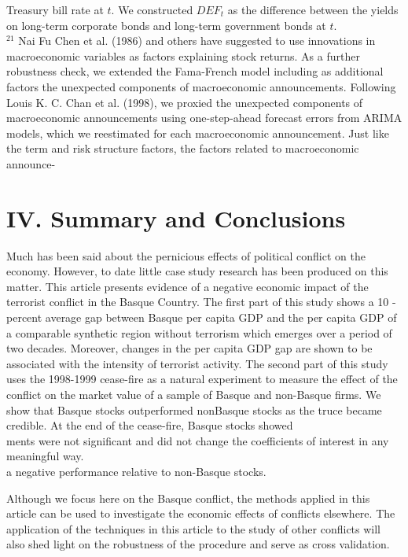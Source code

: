 \documentclass[10pt]{article}
\begin{document}
Treasury bill rate at $t$. We constructed $D E F_{t}$ as the difference between the yields on long-term corporate bonds and long-term government bonds at $t$.\\
${ }^{21}$ Nai Fu Chen et al. (1986) and others have suggested to use innovations in macroeconomic variables as factors explaining stock returns. As a further robustness check, we extended the Fama-French model including as additional factors the unexpected components of macroeconomic announcements. Following Louis K. C. Chan et al. (1998), we proxied the unexpected components of macroeconomic announcements using one-step-ahead forecast errors from ARIMA models, which we reestimated for each macroeconomic announcement. Just like the term and risk structure factors, the factors related to macroeconomic announce-

\section*{IV. Summary and Conclusions}
Much has been said about the pernicious effects of political conflict on the economy. However, to date little case study research has been produced on this matter. This article presents evidence of a negative economic impact of the terrorist conflict in the Basque Country. The first part of this study shows a 10 -percent average gap between Basque per capita GDP and the per capita GDP of a comparable synthetic region without terrorism which emerges over a period of two decades. Moreover, changes in the per capita GDP gap are shown to be associated with the intensity of terrorist activity. The second part of this study uses the 1998-1999 cease-fire as a natural experiment to measure the effect of the conflict on the market value of a sample of Basque and non-Basque firms. We show that Basque stocks outperformed nonBasque stocks as the truce became credible. At the end of the cease-fire, Basque stocks showed\\
ments were not significant and did not change the coefficients of interest in any meaningful way.\\
a negative performance relative to non-Basque stocks.

Although we focus here on the Basque conflict, the methods applied in this article can be used to investigate the economic effects of conflicts elsewhere. The application of the techniques in this article to the study of other conflicts will also shed light on the robustness of the procedure and serve as cross validation.
\end{document}
